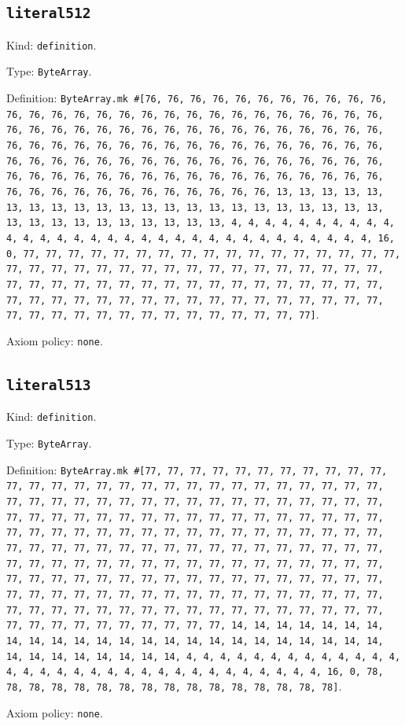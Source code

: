 \documentclass[11pt]{article}
\begin{document}
\subsection*{\texttt{literal512}}
\noindent Kind: \texttt{definition}.\par
\noindent Type: \texttt{ByteArray}.\par
\noindent Definition: \texttt{ByteArray.mk \#[76, 76, 76, 76, 76, 76, 76, 76, 76, 76, 76, 76, 76, 76, 76, 76, 76, 76, 76, 76, 76, 76, 76, 76, 76, 76, 76, 76, 76, 76, 76, 76, 76, 76, 76, 76, 76, 76, 76, 76, 76, 76, 76, 76, 76, 76, 76, 76, 76, 76, 76, 76, 76, 76, 76, 76, 76, 76, 76, 76, 76, 76, 76, 76, 76, 76, 76, 76, 76, 76, 76, 76, 76, 76, 76, 76, 76, 76, 76, 76, 76, 76, 76, 76, 76, 76, 76, 76, 76, 76, 76, 76, 76, 76, 76, 76, 76, 76, 76, 76, 76, 76, 76, 76, 76, 76, 76, 76, 13, 13, 13, 13, 13, 13, 13, 13, 13, 13, 13, 13, 13, 13, 13, 13, 13, 13, 13, 13, 13, 13, 13, 13, 13, 13, 13, 13, 13, 13, 13, 13, 4, 4, 4, 4, 4, 4, 4, 4, 4, 4, 4, 4, 4, 4, 4, 4, 4, 4, 4, 4, 4, 4, 4, 4, 4, 4, 4, 4, 4, 4, 4, 4, 16, 0, 77, 77, 77, 77, 77, 77, 77, 77, 77, 77, 77, 77, 77, 77, 77, 77, 77, 77, 77, 77, 77, 77, 77, 77, 77, 77, 77, 77, 77, 77, 77, 77, 77, 77, 77, 77, 77, 77, 77, 77, 77, 77, 77, 77, 77, 77, 77, 77, 77, 77, 77, 77, 77, 77, 77, 77, 77, 77, 77, 77, 77, 77, 77, 77, 77, 77, 77, 77, 77, 77, 77, 77, 77, 77, 77, 77, 77, 77, 77, 77, 77, 77]}.\par
\noindent Axiom policy: \texttt{none}.\par
\subsection*{\texttt{literal513}}
\noindent Kind: \texttt{definition}.\par
\noindent Type: \texttt{ByteArray}.\par
\noindent Definition: \texttt{ByteArray.mk \#[77, 77, 77, 77, 77, 77, 77, 77, 77, 77, 77, 77, 77, 77, 77, 77, 77, 77, 77, 77, 77, 77, 77, 77, 77, 77, 77, 77, 77, 77, 77, 77, 77, 77, 77, 77, 77, 77, 77, 77, 77, 77, 77, 77, 77, 77, 77, 77, 77, 77, 77, 77, 77, 77, 77, 77, 77, 77, 77, 77, 77, 77, 77, 77, 77, 77, 77, 77, 77, 77, 77, 77, 77, 77, 77, 77, 77, 77, 77, 77, 77, 77, 77, 77, 77, 77, 77, 77, 77, 77, 77, 77, 77, 77, 77, 77, 77, 77, 77, 77, 77, 77, 77, 77, 77, 77, 77, 77, 77, 77, 77, 77, 77, 77, 77, 77, 77, 77, 77, 77, 77, 77, 77, 77, 77, 77, 77, 77, 77, 77, 77, 77, 77, 77, 77, 77, 77, 77, 77, 77, 77, 77, 77, 77, 77, 77, 77, 77, 77, 77, 77, 77, 77, 77, 77, 77, 77, 77, 77, 77, 77, 77, 77, 77, 77, 77, 77, 77, 77, 77, 77, 77, 77, 77, 14, 14, 14, 14, 14, 14, 14, 14, 14, 14, 14, 14, 14, 14, 14, 14, 14, 14, 14, 14, 14, 14, 14, 14, 14, 14, 14, 14, 14, 14, 14, 14, 4, 4, 4, 4, 4, 4, 4, 4, 4, 4, 4, 4, 4, 4, 4, 4, 4, 4, 4, 4, 4, 4, 4, 4, 4, 4, 4, 4, 4, 4, 4, 4, 16, 0, 78, 78, 78, 78, 78, 78, 78, 78, 78, 78, 78, 78, 78, 78, 78, 78]}.\par
\noindent Axiom policy: \texttt{none}.\par
\end{document}
